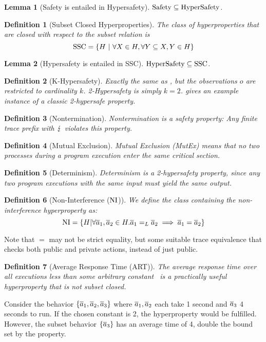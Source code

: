 \documentclass[a4paper,names,dvipsnames]{article}
\newtheorem{definition}{Definition}
\newtheorem{lemma}{Lemma}
\begin{document}
\begin{lemma}[Safety is entailed in Hypersafety]
  $\text{Safety}\subseteq\text{HyperSafety}$.
\end{lemma}

\begin{definition}[Subset Closed Hyperproperties]
  The class of hyperproperties that are closed with respect to the subset relation is
  $$
  \cSS = \left\{H\ |\ \forall X\in H, \forall Y\subseteq X, Y \in H\right\}
  $$
\end{definition}

\begin{lemma}[Hypersafety is entailed in SSC]
  $\text{HyperSafety}\subseteq\text{SSC}$.
\end{lemma}

\begin{definition}[K-Hypersafety]
  Exactly the same as , but the observations $o$ are restricted to cardinality $k$.
  2-Hypersafety is simply $k=2$.  gives an example instance of a classic 2-hypersafe property.
\end{definition}

\begin{definition}[Nontermination]
  Nontermination is a safety property: Any finite trace prefix with $\lightning$ violates this property.
\end{definition}

\begin{definition}[Mutual Exclusion]
  Mutual Exclusion (MutEx) means that no two processes during a program execution enter the same critical section.
\end{definition}

\begin{definition}[Determinism]
  Determinism is a 2-hypersafety property, since any two program executions with the same input must yield the same output.
\end{definition}

\begin{definition}[Non-Interference ($\text{NI}$)]\label{def:ni}
  We define the class containing the non-interference hyperproperty as:
  $$
  \text{NI} = \left\{ H | \forall \overline{a}_{1},\overline{a}_{2}\in H. {\overline{a}_{1}}=_L{\overline{a}_{2}}\implies\overline{a}_{1}=\overline{a}_{2} \right\}
  $$
\end{definition}
Note that $=$ may not be strict equality, but some suitable trace equivalence that checks both public and private actions, instead of just public.

\begin{definition}[Average Response Time (ART)]
  The average response time over all executions less than some arbitrary constant~\cite{clarkson08} is a practically useful hyperproperty that is not subset closed.
\end{definition}
Consider the behavior $\{\overline{a}_{1},\overline{a}_{2},\overline{a}_{3}\}$ where $\overline{a}_{1},\overline{a}_{2}$ each take 1 second and $\overline{a}_{3}$ 4 seconds to run.
If the chosen constant is 2, the hyperproperty would be fulfilled. However, the subset behavior $\{\overline{a}_{3}\}$ has an average time of 4, double the bound set by the property.
\end{document}

